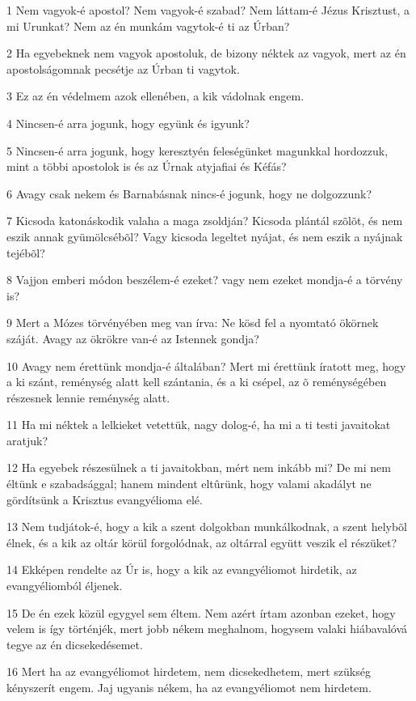 \par 1 Nem vagyok-é apostol? Nem vagyok-é szabad? Nem láttam-é Jézus Krisztust, a mi Urunkat? Nem az én munkám vagytok-é  ti az Úrban?
\par 2 Ha egyebeknek nem vagyok apostoluk, de bizony néktek az vagyok, mert az én apostolságomnak pecsétje az Úrban ti vagytok.
\par 3 Ez az én védelmem azok ellenében, a kik vádolnak engem.
\par 4 Nincsen-é arra jogunk, hogy együnk és igyunk?
\par 5 Nincsen-é arra jogunk, hogy keresztyén feleségünket magunkkal hordozzuk, mint a többi apostolok is és az Úrnak atyjafiai és Kéfás?
\par 6 Avagy csak nekem és Barnabásnak nincs-é jogunk, hogy ne dolgozzunk?
\par 7 Kicsoda katonáskodik valaha a maga zsoldján? Kicsoda plántál szõlõt, és nem eszik annak gyümölcsébõl? Vagy kicsoda legeltet nyájat, és nem eszik a nyájnak tejébõl?
\par 8 Vajjon emberi módon beszélem-é ezeket? vagy nem ezeket mondja-é a törvény is?
\par 9 Mert a Mózes törvényében meg van írva: Ne kösd fel a nyomtató ökörnek száját. Avagy az ökrökre van-é az Istennek gondja?
\par 10 Avagy nem érettünk mondja-é általában? Mert mi érettünk íratott meg, hogy a ki szánt, reménység alatt kell szántania, és a ki csépel, az õ reménységében részesnek lennie reménység alatt.
\par 11 Ha mi néktek a lelkieket vetettük,  nagy dolog-é, ha mi a ti testi javaitokat aratjuk?
\par 12 Ha egyebek részesülnek a ti javaitokban, mért nem inkább mi? De  mi nem éltünk e szabadsággal; hanem mindent eltûrünk, hogy valami akadályt ne gördítsünk a Krisztus evangyélioma elé.
\par 13 Nem tudjátok-é, hogy a kik a szent dolgokban munkálkodnak, a szent helybõl élnek, és a kik az oltár körül forgolódnak, az oltárral együtt veszik el részüket?
\par 14 Ekképen rendelte az Úr is, hogy a kik az evangyéliomot hirdetik, az evangyéliomból éljenek.
\par 15 De én ezek közül egygyel sem éltem. Nem azért írtam azonban ezeket, hogy velem is így történjék, mert jobb nékem meghalnom, hogysem valaki hiábavalóvá tegye az én dicsekedésemet.
\par 16 Mert ha az evangyéliomot hirdetem, nem dicsekedhetem, mert szükség kényszerít engem. Jaj ugyanis nékem, ha az evangyéliomot nem hirdetem.
